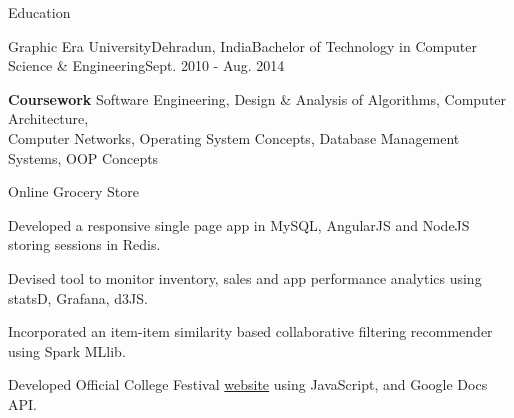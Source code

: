 \documentclass{resume} %
\begin{document}
\begin{rSection}{Education}
\begin{rSubsection}{Graphic Era University}{Dehradun, India}{Bachelor of Technology in Computer Science \& Engineering}{Sept. 2010 - Aug. 2014}
\item \textbf{Coursework} Software Engineering, Design \& Analysis of Algorithms, Computer Architecture, \\ Computer Networks, Operating System Concepts, Database Management Systems, OOP Concepts \smallskip
\item Online Grocery Store
\begin{rSubsubsection}
\item Developed a responsive single page app in MySQL, AngularJS and NodeJS storing sessions in Redis.
\item Devised tool to monitor inventory, sales and app performance analytics using statsD, Grafana, d3JS.
\item Incorporated an item-item similarity based collaborative filtering recommender using Spark MLlib.
\end{rSubsubsection} \smallskip
\item Developed Official College Festival \href{http://iblong2iyhttps://preview.overleaf.com/public/qycvbyjhwrmh/images/78709a256178de9896998a942796c447cb008f76.jpegush.github.io/grafest}{website} using JavaScript, and Google Docs API.
\end{rSubsection}

\end{rSection}

\end{document}
